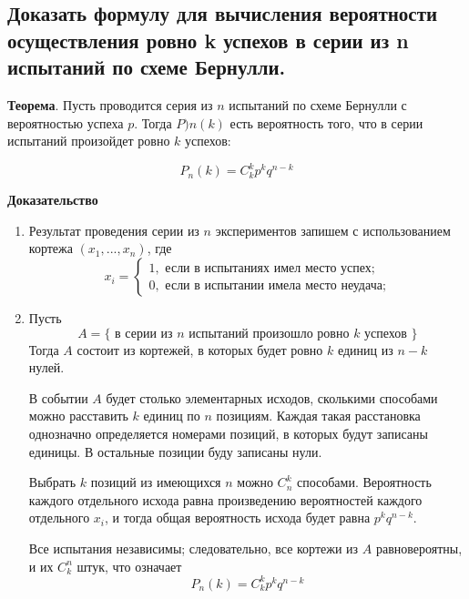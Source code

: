\subsection{Доказать формулу для вычисления вероятности осуществления ровно k успехов в серии из n испытаний по схеме Бернулли.}

\textbf{Теорема}. Пусть проводится серия из $n$ испытаний по схеме Бернулли с вероятностью успеха $p$. Тогда $P){n}(k)$ есть вероятность того, что в серии испытаний произойдет ровно $k$ успехов:

\begin{equation}
	P_{n}(k) = C_{k}^{k} p^{k} q^{n - k}
\end{equation}

\textbf{Доказательство}
\begin{enumerate}
	\item Результат проведения серии из $n$ экспериментов запишем с использованием кортежа $(x_{1}, ... , x_{n})$, где
	\begin{equation}
		x_{i} = 
		\begin{cases}
			1, \text{ если в испытаниях имел место успех;}\\
			0, \text{ если в испытании имела место неудача;}
		\end{cases}
	\end{equation}
	\item Пусть
	\begin{equation}
		A = \{ \text{ в серии из } n \text{ испытаний произошло ровно } k \text{ успехов }\}
	\end{equation}
	Тогда $A$ состоит из кортежей, в которых будет ровно $k$ единиц из $n-k$ нулей.
	
	В событии $A$ будет столько элементарных исходов, сколькими способами можно расставить $k$ единиц по $n$ позициям. Каждая такая расстановка однозначно определяется номерами позиций, в которых будут записаны единицы. В остальные позиции буду записаны нули.
	
	Выбрать $k$ позиций из имеющихся $n$ можно $C_{n}^{k}$ способами. Вероятность каждого отдельного исхода равна произведению вероятностей каждого отдельного
	$x_{i}$, и тогда общая вероятность исхода будет равна $p^{k} q^{n - k}$. 
	
	Все испытания независимы; следовательно, все кортежи из $A$ равновероятны,	и их $C_{k}^{n}$ штук, что означает
	\begin{equation}
		P_{n}(k) = C_{k}^{k} p^{k} q^{n - k}
	\end{equation}
\end{enumerate}